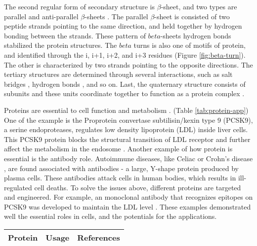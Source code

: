 \begin{refsection}
The second regular form of secondary structure is $\beta$-sheet, and two types
are parallel and anti-parallel $\beta$-sheets \cite{Astbury1932}. The parallel
$\beta$-sheet is consisted of two peptide strands pointing to the same
direction, and held together by hydrogen bonding between the strands. These
pattern of $beta$-sheets hydrogen bonds stabilized the protein structures. The
$beta$ turns is also one of motifs of protein, and identified through the i,
i+1, i+2, and i+3 residues \cite{Nemethy1972} (Figure \ref{fig:beta-turn}). The
other is characterized by two strands pointing to the opposite directions. The
tertiary structures are determined through several interactions, such as salt
bridges \cite{Privalov2009}, hydrogen bonds \cite{Sheridan1982}, and so on.
Last, the quaternary structure consists of subunits and these units coordinate
together to function as a protein complex \cite{Privalov2009}.

Proteins are essential to cell function and metabolism
\cite{Lambert2012,Horton2007,Dessein2008}. (Table \ref{tab:protein-app}) One of
the example is the Proprotein convertase subtilisin/kexin type 9 (PCSK9), a
serine endoproteases, regulates low density lipoprotein (LDL) inside liver
cells\cite{Lambert2012,Horton2007}. This PCSK9 protein blocks the structural
transition of LDL receptor and further affect the metabolism in the endosome
\cite{Lambert2012}. Another example of how protein is essential is the antibody
role. Autoimmune diseases, like Celiac \cite{Dessein2008} or
Crohn's disease \cite{Sollid2005, Meize-Grochowski}, are found associated with
antibodies - a large, Y-shape protein produced by plasma cells. These
antibodies attack cells in human bodies, which results in ill-regulated cell
deaths. To solve the issues above, different proteins are targeted and
engineered. For example, an monoclonal antibody that recognizes epitopes on
PCSK9 was developed to maintain the LDL level \cite{Lambert2012}. These
examples demonstrated well the essential roles in cells, and the potentials for
the applications.   

\begin{table}[htbp]
    \centering
    \begin{tabular}{ lll }
        \hline
        Protein & Usage & References \\
        \hline
        

\end{tabular}
\end{table}
\end{refsection}

